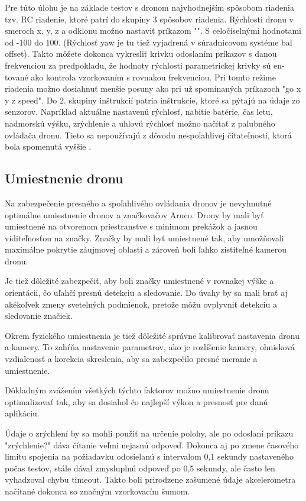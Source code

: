 {Pre túto úlohu je na základe testov s dronom najvhodnejším spôsobom riadenia tzv. RC riadenie, ktoré patrí do skupiny 3 spôsobov riadenia. Rýchlosti dronu v smeroch x, y, z a odklonu možno nastaviť príkazom "". S celočíselnými hodnotami od -100 do 100. (Rýchlosť yaw je tu tiež vyjadrená v súradnicovom systéme bal offset). Takto môžete dokonca vykresliť krivku odoslaním príkazov s danou frekvenciou za predpokladu, že hodnoty rýchlosti parametrickej krivky sú en- tované ako kontrola vzorkovaním s rovnakou frekvenciou. Pri tomto režime riadenia možno dosiahnuť menšie posuny ako pri už spomínaných príkazoch "go x y z speed". 
Do 2. skupiny inštrukcií patria inštrukcie, ktoré sa pýtajú na údaje zo senzorov. Napríklad aktuálne nastavenú rýchlosť, nabitie batérie, čas letu, nadmorskú výšku, zrýchlenie a uhlovú rýchlosť možno načítať z palubného ovládača dronu. Tieto sa nepoužívajú z dôvodu nespoľahlivej čitateľnosti, ktorá bola spomenutá vyššie \citep{TelloSDK}.

\subsection{Umiestnenie dronu}
Na zabezpečenie presného a spoľahlivého ovládania dronov je nevyhnutné optimálne umiestnenie dronov a značkovačov Aruco. Drony by mali byť umiestnené na otvorenom priestranstve s minimom prekážok a jasnou viditeľnosťou na značky. Značky by mali byť umiestnené tak, aby umožňovali maximálne pokrytie záujmovej oblasti a zároveň boli ľahko zistiteľné kamerou dronu.

Je tiež dôležité zabezpečiť, aby boli značky umiestnené v rovnakej výške a orientácii, čo uľahčí presnú detekciu a sledovanie. Do úvahy by sa mali brať aj akékoľvek zmeny svetelných podmienok, pretože môžu ovplyvniť detekciu a sledovanie značiek.

Okrem fyzického umiestnenia je tiež dôležité správne kalibrovať nastavenia dronu a kamery. To zahŕňa nastavenie parametrov, ako je rozlíšenie kamery, ohnisková vzdialenosť a korekcia skreslenia, aby sa zabezpečilo presné meranie a umiestnenie.

Dôkladným zvážením všetkých týchto faktorov možno umiestnenie dronu optimalizovať tak, aby sa dosiahol čo najlepší výkon a presnosť pre danú aplikáciu.

Údaje o zrýchlení by sa mohli použiť na určenie polohy, ale po odoslaní príkazu "zrýchlenie?" dáva čítanie veľmi nejasnú odpoveď. Dokonca aj po zmene časového limitu spojenia na požiadavku odosielanú s intervalom 0,1 sekundy nastaveného počas testov, stále dával zmysluplnú odpoveď po 0,5 sekundy, ale často len vyhadzoval chybu timeout. Takto boli prirodzene zašumené údaje akcelerometra načítané dokonca so značným vzorkovacím šumom. 

}
